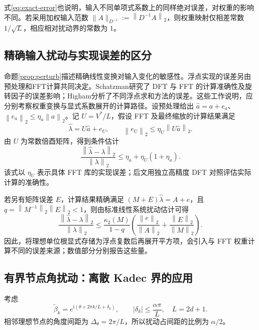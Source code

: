 \documentclass[UTF8,a4paper,zihao=-4,fontset=windows]{ctexart}
\theoremstyle{chinese}
\numberwithin{equation}{section}
\newcommand{\norm}[1]{\left\lVert#1\right\rVert_2}
\newcommand{\cond}{\kappa_2}
\begin{document}
式\eqref{eq:exact-error}也说明，输入不同单项式系数上的同样绝对误差，对权重的影响不同。若采用加权输入范数 $\lVert A\rVert_{D^{-1}}:=\norm{D^{-1}A}$，则权重映射仅相差常数 $1/\sqrt L$，相应相对扰动界的常数为 $1$。

\subsection{精确输入扰动与实现误差的区分}
命题\ref{prop:perturb}描述精确线性变换对输入变化的敏感性。浮点实现的误差另由预处理和FFT计算共同决定。Schatzman\cite{schatzman}研究了 DFT 与 FFT 的计算准确性及旋转因子的误差影响；Higham\cite{summation}分析了不同浮点求和方法的误差。这些工作说明，应分别考察权重变换与显式系数展开的计算路径。设预处理给出 $\widehat a=a+e_a$、$\norm{e_a}\le\eta_a\norm a$。记 $U=V^*/L$，假设 FFT 及最终缩放的计算结果满足
\[
\widehat\lambda=U\widehat a+e_U,
\qquad \norm{e_U}\le\eta_U\norm{U\widehat a}.
\]
由 $U$ 为常数倍酉矩阵，得到条件估计
\begin{equation}\label{eq:model}
\frac{\norm{\widehat\lambda-\lambda}}{\norm\lambda}
\le\eta_a+\eta_U(1+\eta_a).
\end{equation}
该式以 $\eta_U$ 表示具体 FFT 库的实现误差；后文用独立高精度 DFT 对照评估实际计算的准确性。

若另有矩阵误差 $E$，计算结果精确满足 $(M+E)\widehat\lambda=A+e$，且 $q=\norm{M^{-1}}\norm E<1$，则由标准线性系统扰动估计\cite[第7章]{higham}可得
\begin{equation}\label{eq:matrix-perturbation}
\frac{\norm{\widehat\lambda-\lambda}}{\norm\lambda}
\le\frac{\cond(M)}{1-q}
\left(\frac{\norm e}{\norm A}+\frac{\norm E}{\norm M}\right).
\end{equation}
因此，将理想单位根显式存储为浮点复数后再展开平方项，会引入与 FFT 权重计算不同的误差来源；数值部分分别报告这些量。

\subsection{有界节点角扰动：离散 Kadec 界的应用}
考虑
\[
\widetilde\beta_k=e^{\mathrm i(\theta+2\pi k/L+\delta_k)},\qquad
|\delta_k|\le\frac{\alpha\pi}{L},\quad L=2d+1.
\]
相邻理想节点的角度间距为 $\Delta_\theta=2\pi/L$，所以扰动占间距的比例为 $\alpha/2$。
\end{document}
